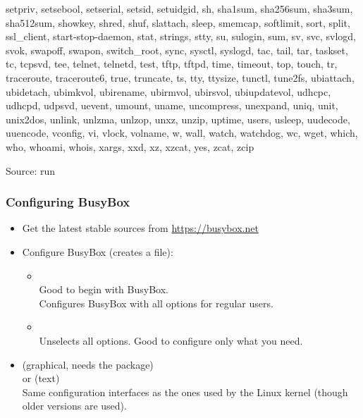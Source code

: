 \begin{frame}
\begin{spacing}{0}
{setpriv, setsebool, setserial, setsid, setuidgid, sh, sha1sum,
sha256sum, sha3sum, sha512sum, showkey, shred, shuf, slattach, sleep,
smemcap, softlimit, sort, split, ssl_client, start-stop-daemon, stat,
strings, stty, su, sulogin, sum, sv, svc, svlogd, svok, swapoff, swapon,
switch_root, sync, sysctl, syslogd, tac, tail, tar, taskset, tc, tcpsvd,
tee, telnet, telnetd, test, tftp, tftpd, time, timeout, top, touch, tr,
traceroute, traceroute6, true, truncate, ts, tty, ttysize, tunctl,
tune2fs, ubiattach, ubidetach, ubimkvol, ubirename, ubirmvol, ubirsvol,
ubiupdatevol, udhcpc, udhcpd, udpsvd, uevent, umount, uname, uncompress, unexpand, uniq,
unit, unix2dos, unlink, unlzma, unlzop, unxz, unzip, uptime, users,
usleep, uudecode, uuencode, vconfig, vi, vlock, volname, w, wall, watch,
watchdog, wc, wget, which, who, whoami, whois, xargs, xxd, xz, xzcat,
yes, zcat, zcip}
  \end{spacing}
  \vfill
  Source: run 
\end{frame}

\begin{frame}
  \frametitle{Configuring BusyBox}
  \begin{itemize}
  \item Get the latest stable sources from \url{https://busybox.net}
  \item Configure BusyBox (creates a  file):
    \begin{itemize}
    \item {}\\
      Good to begin with BusyBox.\\
      Configures BusyBox with all options for regular users.
    \item {}\\
      Unselects all options. Good to configure only what you need.
    \end{itemize}
  \item {} (graphical, needs the  package)\\
    or  (text)\\
    Same configuration interfaces as the ones used by the Linux kernel
    (though older versions are used).
  \end{itemize}
\end{frame}

